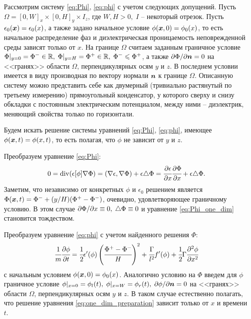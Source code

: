Рассмотрим систему \eqref{eq:Phi}, \eqref{eq:phi} с учетом следующих допущений. Пусть $\Omega = [0, W]_x \times [0, H]_y \times I_z$, где $W, H > 0, \; I$ -- некоторый отрезок. Пусть $\epsilon_0({\boldsymbol{x}}) = \epsilon_0(x)$, а также задано начальное условие $\phi({\boldsymbol{x}}, 0) = \phi_0(x)$, то есть начальное распределение фаз и диэлектрическая проницаемость неповрежденной среды зависят только от $x$. На границе $\Omega$ считаем заданным граничное условие $\Phi|_{y = 0} = \Phi^- \in {\mathbb{R}}, \; \Phi|_{y = H} = \Phi^+ \in {\mathbb{R}}, \; \Phi^- \leqslant \Phi^+$, а также $\partial \Phi / \partial {\boldsymbol{n}}= 0$ на <<гранях>> области $\Omega$, перпендикулярных осям $y$ и $z$. В последнем условии имеется в виду производная по вектору нормали ${\boldsymbol{n}}$ к границе $\Omega$. Описанную систему можно представить себе как двумерный (тривиально растянутый по третьему измерению) прямоугольный конденсатор, у которого сверху и снизу обкладки с постоянным электрическим потенциалом, между ними -- диэлектрик, меняющий свойства только по горизонтали.

Будем искать решение системы уравнений \eqref{eq:Phi}, \eqref{eq:phi}, имеющее $\phi({\boldsymbol{x}}, t) = \phi(x, t)$, то есть полагая, что $\phi$ не зависит от $y$ и $z$.

Преобразуем уравнение \eqref{eq:Phi}:
\begin{equation}
	0 = \operatorname{{div}}(\epsilon[\phi] \nabla \Phi) = (\nabla \epsilon, \nabla \Phi) + \epsilon \triangle \Phi = \cfrac{\partial \epsilon}{\partial x} \cfrac{\partial \Phi}{\partial x} + \epsilon \triangle \Phi {\text{.}}
	\label{eq:Phi_one_dim}
\end{equation}
Заметим, что независимо от конкретных $\phi$ и $\epsilon_0$ решением является $\Phi({\boldsymbol{x}}, t) = \Phi^- + (y / H)(\Phi^+ - \Phi^-)$, очевидно, удовлетворяющее граничному условию. В этом случае $\partial \Phi / \partial x \equiv 0, \; \triangle \Phi \equiv 0$ и уравнение \eqref{eq:Phi_one_dim} становится тождеством.

Преобразуем уравнение \eqref{eq:phi} с учетом найденного решения $\Phi$:
\begin{equation}
	\cfrac{1}{m} \cfrac{\partial \phi}{\partial t} = \cfrac{1}{2} \epsilon'(\phi) \left( \cfrac{\Phi^+ - \Phi^-}{H} \right)^2 + \cfrac{\Gamma}{l^2} f'(\phi) + \cfrac{1}{2} \Gamma \cfrac{\partial^2 \phi}{\partial x^2}
	\label{eq:one_dim_preparation}
\end{equation}
с начальным условием $\phi({\boldsymbol{x}}, 0) = \phi_0(x)$. Аналогично условию на $\Phi$ введем для $\phi$ граничное условие $\phi|_{x = 0} = \phi_l(t), \; \phi|_{x = W} = \phi_r(t), \; \partial \phi / \partial {\boldsymbol{n}} = 0$ на <<гранях>> области $\Omega$, перпендикулярных осям $y$ и $z$. В таком случае естественно полагать, что решение уравнения \eqref{eq:one_dim_preparation} зависит только от $x$ и времени $t$.

